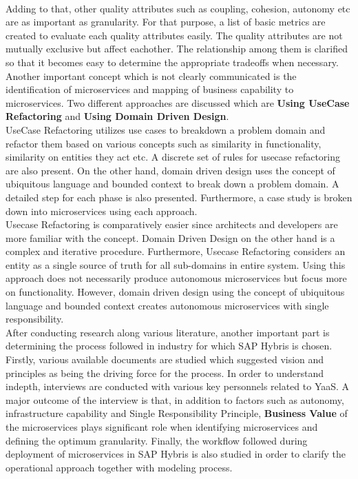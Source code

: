 \\
Adding to that, other quality attributes such as coupling, cohesion, autonomy etc are as important as granularity. For that purpose, a list of basic metrics are created to evaluate each quality attributes easily. The quality attributes are not mutually exclusive but affect eachother. The relationship among them is clarified so that it becomes easy to determine the appropriate tradeoffs when necessary.\\
Another important concept which is not clearly communicated is the identification of microservices and mapping of business capability to microservices. Two different approaches are discussed which are \textbf{Using UseCase Refactoring} and  \textbf{Using Domain Driven Design}.\\
UseCase Refactoring utilizes use cases to breakdown a problem domain and refactor them based on various concepts such as similarity in functionality, similarity on entities they act etc. A discrete set of rules for usecase refactoring are also present. On the other hand, domain driven design uses the concept of ubiquitous language and bounded context to break down a problem domain. A detailed step for each phase is also presented. Furthermore, a case study is broken down into microservices using each approach.\\
Usecase Refactoring is comparatively easier since architects and developers are more familiar with the concept. Domain Driven Design on the other hand is a complex and iterative procedure. Furthermore, Usecase Refactoring considers an entity as a single source of truth for all sub-domains in entire system. Using this approach does not necessarily produce autonomous microservices but focus more on functionality. However, domain driven design using the concept of ubiquitous language and bounded context creates autonomous microservices with single responsibility.\\
After conducting research along various literature, another important part is determining the process followed in industry for which SAP Hybris is chosen. Firstly, various available documents are studied which suggested vision and principles as being the driving force for the process. In order to understand indepth, interviews are conducted with various key personnels related to \acrshort{YaaS}. A major outcome of the interview is that, in addition to factors such as autonomy, infrastructure capability and Single Responsibility Principle, \textbf{Business Value} of the microservices plays significant role when identifying microservices  and defining the optimum granularity. Finally, the workflow followed during deployment of microservices in SAP Hybris is also studied in order to clarify the operational approach together with modeling process.\\
